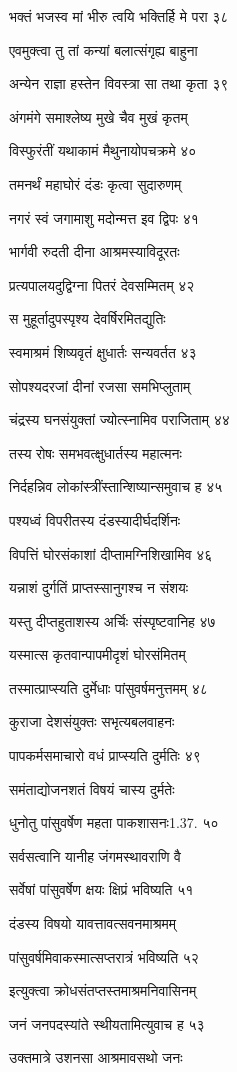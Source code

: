 भक्तं भजस्व मां भीरु त्वयि भक्तिर्हि मे परा ३८

एवमुक्त्वा तु तां कन्यां बलात्संगृह्य बाहुना

अन्येन राज्ञा हस्तेन विवस्त्रा सा तथा कृता ३९

अंगमंगे समाश्लेष्य मुखे चैव मुखं कृतम्

विस्फुरंतीं यथाकामं मैथुनायोपचक्रमे ४०

तमनर्थं महाघोरं दंडः कृत्वा सुदारुणम्

नगरं स्वं जगामाशु मदोन्मत्त इव द्विपः ४१

भार्गवी रुदती दीना आश्रमस्याविदूरतः

प्रत्यपालयदुद्विग्ना पितरं देवसम्मितम् ४२

स मुहूर्तादुपस्पृश्य देवर्षिरमितद्युतिः

स्वमाश्रमं शिष्यवृतं क्षुधार्तः सन्यवर्तत ४३

सोपश्यदरजां दीनां रजसा समभिप्लुताम्

चंद्रस्य घनसंयुक्तां ज्योत्स्नामिव पराजिताम् ४४

तस्य रोषः समभवत्क्षुधार्तस्य महात्मनः

निर्दहन्निव लोकांस्त्रींस्तान्शिष्यान्समुवाच ह ४५

पश्यध्वं विपरीतस्य दंडस्यादीर्घदर्शिनः

विपत्तिं घोरसंकाशां दीप्तामग्निशिखामिव ४६

यन्नाशं दुर्गतिं प्राप्तस्सानुगश्च न संशयः

यस्तु दीप्तहुताशस्य अर्चिः संस्पृष्टवानिह ४७

यस्मात्स कृतवान्पापमीदृशं घोरसंमितम्

तस्मात्प्राप्स्यति दुर्मेधाः पांसुवर्षमनुत्तमम् ४८

कुराजा देशसंयुक्तः सभृत्यबलवाहनः

पापकर्मसमाचारो वधं प्राप्स्यति दुर्मतिः ४९

समंताद्योजनशतं विषयं चास्य दुर्मतेः

धुनोतु पांसुवर्षेण महता पाकशासनः1.37. ५०

सर्वसत्वानि यानीह जंगमस्थावराणि वै

सर्वेषां पांसुवर्षेण क्षयः क्षिप्रं भविष्यति ५१

दंडस्य विषयो यावत्तावत्सवनमाश्रमम्

पांसुवर्षमिवाकस्मात्सप्तरात्रं भविष्यति ५२

इत्युक्त्वा क्रोधसंतप्तस्तमाश्रमनिवासिनम्

जनं जनपदस्यांते स्थीयतामित्युवाच ह ५३

उक्तमात्रे उशनसा आश्रमावसथो जनः

